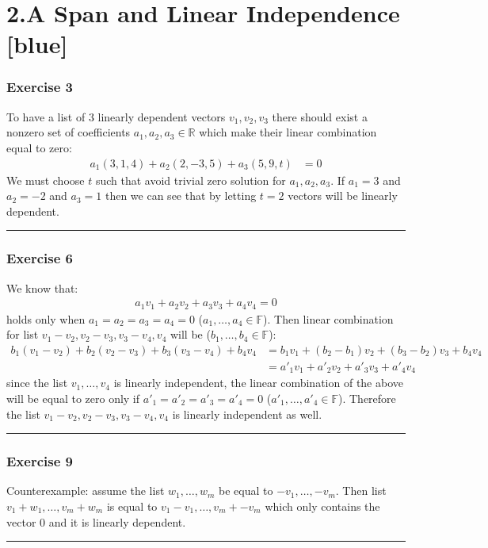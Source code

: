\documentclass[12pt, letterpaper]{scrartcl}
\newcommand{\R}{\mathbb{R}}
\newcommand{\F}{\mathbb{F}}
\begin{document}
\vskip10mm
\section*{2.A Span and Linear Independence  \xrfill[2pt]{3pt}[blue]}
\subsubsection*{Exercise 3}
To have a list of 3 linearly dependent vectors $v_1, v_2, v_3$ there should exist a nonzero set of coefficients $a_1, a_2, a_3 \in \R$ which make their linear combination equal to zero:
\begin{align*}
    a_1(3,1,4)+a_2(2,-3,5)+a_3(5,9,t)&=0
\end{align*}
We must choose $t$ such that avoid trivial zero solution for $a_1, a_2, a_3$.
If $a_1=3$ and $a_2=-2$ and $a_3=1$ then we can see that by letting $t=2$ vectors will be linearly dependent.
\vskip1mm\hrule
\subsubsection*{Exercise 6}
We know that:
\begin{align*}
    a_1v_1+a_2v_2+a_3v_3+a_4v_4=0
\end{align*}
holds only when $a_1=a_2=a_3=a_4=0$ ($a_1,\dots,a_4\in\F$). Then linear combination for list $v_1-v_2, v_2-v_3, v_3-v_4, v_4$ will be ($b_1,\dots,b_4\in\F$):
\begin{align*}
    b_1(v_1-v_2)+b_2(v_2-v_3)+b_3(v_3-v_4)+b_4v_4&=b_1v_1+(b_2-b_1)v_2+(b_3-b_2)v_3+b_4v_4\\
    &=a'_1v_1+a'_2v_2+a'_3v_3+a'_4v_4
\end{align*}
since the list $v_1,\dots,v_4$ is linearly independent, the linear combination of the above will be equal to zero only if $a'_1=a'_2=a'_3=a'_4=0$ ($a'_1,\dots,a'_4\in\F$). Therefore the list $v_1-v_2, v_2-v_3, v_3-v_4, v_4$ is linearly independent as well.
\vskip1mm\hrule
\subsubsection*{Exercise 9}
Counterexample: assume the list $w_1,\dots,w_m$ be equal to $-v_1,\dots,-v_m$. Then list $v_1+w_1,\dots,v_m+w_m$ is equal to $v_1-v_1,\dots,v_m+-v_m$ which only contains the vector $0$ and it is linearly dependent.
\vskip1mm\hrule
\end{document}
